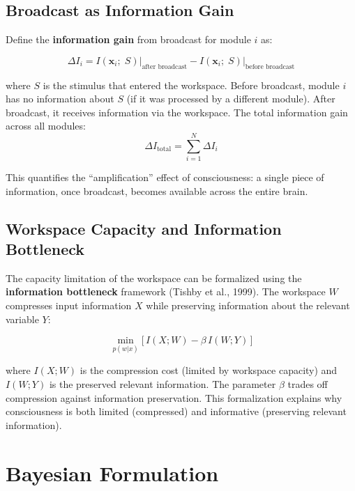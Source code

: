 \documentclass[11pt,a4paper]{report}
\begin{document}
\subsection{Broadcast as Information Gain}

Define the \textbf{information gain} from broadcast for module $i$ as:
\begin{mathbox}
\vspace{-8pt}
\[
  \Delta I_i = I(\mathbf{x}_i;\; S) \big|_{\text{after broadcast}} - I(\mathbf{x}_i;\; S) \big|_{\text{before broadcast}}
\]
\vspace{-10pt}
\end{mathbox}

where $S$ is the stimulus that entered the workspace. Before broadcast, module $i$ has no information about $S$ (if it was processed by a different module). After broadcast, it receives information via the workspace. The total information gain across all modules:
\[
  \Delta I_{\text{total}} = \sum_{i=1}^{N} \Delta I_i
\]

This quantifies the ``amplification'' effect of consciousness: a single piece of information, once broadcast, becomes available across the entire brain.

\subsection{Workspace Capacity and Information Bottleneck}

The capacity limitation of the workspace can be formalized using the \textbf{information bottleneck} framework (Tishby et al., 1999). The workspace $W$ compresses input information $X$ while preserving information about the relevant variable $Y$:

\begin{mathbox}
\vspace{-8pt}
\[
  \min_{p(w|x)} \Big[\, I(X; W) - \beta\, I(W; Y)\,\Big]
\]
\vspace{-10pt}
\end{mathbox}

where $I(X; W)$ is the compression cost (limited by workspace capacity) and $I(W; Y)$ is the preserved relevant information. The parameter $\beta$ trades off compression against information preservation. This formalization explains why consciousness is both limited (compressed) and informative (preserving relevant information).

\section{Bayesian Formulation}
\end{document}
